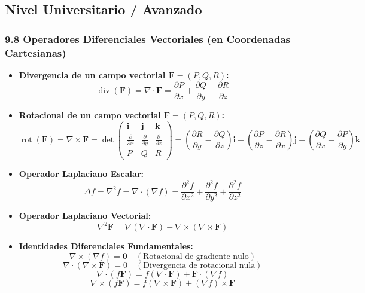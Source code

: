 \documentclass[11pt,a4paper]{article}
\begin{document}
\subsection*{Nivel Universitario / Avanzado}

\subsubsection*{9.8 Operadores Diferenciales Vectoriales (en Coordenadas Cartesianas)}

\begin{itemize}
  \item \textbf{Divergencia de un campo vectorial $\mathbf{F} = (P, Q, R)$:}
  \[
    \operatorname{div}(\mathbf{F}) = \nabla \cdot \mathbf{F} = \frac{\partial P}{\partial x} + \frac{\partial Q}{\partial y} + \frac{\partial R}{\partial z}
  \]
  \item \textbf{Rotacional de un campo vectorial $\mathbf{F} = (P, Q, R)$:}
  \[
    \operatorname{rot}(\mathbf{F}) = \nabla \times \mathbf{F} = \det\begin{pmatrix} \mathbf{i} & \mathbf{j} & \mathbf{k} \\ \frac{\partial}{\partial x} & \frac{\partial}{\partial y} & \frac{\partial}{\partial z} \\ P & Q & R \end{pmatrix} = \left(\frac{\partial R}{\partial y} - \frac{\partial Q}{\partial z}\right)\mathbf{i} + \left(\frac{\partial P}{\partial z} - \frac{\partial R}{\partial x}\right)\mathbf{j} + \left(\frac{\partial Q}{\partial x} - \frac{\partial P}{\partial y}\right)\mathbf{k}
  \]
  \item \textbf{Operador Laplaciano Escalar:}
  \[
    \Delta f = \nabla^2 f = \nabla \cdot (\nabla f) = \frac{\partial^2 f}{\partial x^2} + \frac{\partial^2 f}{\partial y^2} + \frac{\partial^2 f}{\partial z^2}
  \]
  \item \textbf{Operador Laplaciano Vectorial:}
  \[
    \nabla^2 \mathbf{F} = \nabla(\nabla \cdot \mathbf{F}) - \nabla \times (\nabla \times \mathbf{F})
  \]
  \item \textbf{Identidades Diferenciales Fundamentales:}
  \[
    \nabla \times (\nabla f) = \mathbf{0} \quad (\text{Rotacional de gradiente nulo})
  \]
  \[
    \nabla \cdot (\nabla \times \mathbf{F}) = 0 \quad (\text{Divergencia de rotacional nula})
  \]
  \[
    \nabla \cdot (f \mathbf{F}) = f(\nabla \cdot \mathbf{F}) + \mathbf{F} \cdot (\nabla f)
  \]
  \[
    \nabla \times (f \mathbf{F}) = f(\nabla \times \mathbf{F}) + (\nabla f) \times \mathbf{F}
  \]
\end{itemize}
\end{document}
